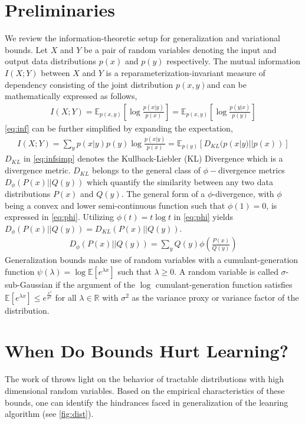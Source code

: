 \documentclass{article}
\begin{document}
\section{Preliminaries}
We review the information-theoretic setup for generalization and variational bounds. Let $X$ and $Y$ be a pair of random variables denoting the input and output data distributions $p(x)$ and $p(y)$ respectively. The mutual information $I(X;Y)$ between $X$ and $Y$ is a reparameterization-invariant measure of dependency consisting of the joint distribution $p(x,y)$and can be mathematically expressed as follows,
\begin{gather}
  I(X;Y) = \mathbb{E}_{p(x,y)}[\log\frac{p(x|y)}{p(x)}] = \mathbb{E}_{p(x,y)}[\log\frac{p(y|x)}{p(y)}] \label{eq:inf}
\end{gather}
\autoref{eq:inf} can be further simplified by expanding the expectation, 
\begin{gather}
  I(X;Y) = \sum_{y}p(x|y)p(y)\log\frac{p(x|y)}{p(x)} = \mathbb{E}_{p(y)}[D_{KL}(p(x|y)||p(x))] \label{eq:infsimp}
\end{gather}
$D_{KL}$ in \autoref{eq:infsimp} denotes the Kullback-Liebler (KL) Divergence \cite{kl} which is a divergence metric. $D_{KL}$ belongs to the general class of $\phi-$divergence metrics $D_{\phi}(P(x)||Q(y))$ which quantify the similarity between any two data distributions $P(x)$ and $Q(y)$. The general form of a $\phi$-divergence, with $\phi$ being a convex and lower semi-continuous function such that $\phi(1)=0$, is expressed in \autoref{eq:phi}. Utilizing $\phi(t)=t\log t$ in \autoref{eq:phi} yields $D_{\phi}(P(x)||Q(y))=D_{KL}(P(x)||Q(y))$.
\begin{gather}
  D_{\phi}(P(x)||Q(y)) = \sum_{y}Q(y)\phi(\frac{P(x)}{Q(y)}) \label{eq:phi}
\end{gather}   
Generalization bounds make use of random variables with a cumulant-generation \cite{cover} function $\psi(\lambda) = \log\mathbb{E}[e^{\lambda x}]$ such that $\lambda \geq 0$. A random variable is called $\sigma$-sub-Gaussian if the argument of the $\log$ cumulant-generation function satisfies $\mathbb{E}[e^{\lambda x}] \leq e^{\frac{\lambda^{2}}{\sigma^{2}}}$ for all $\lambda \in \mathbb{R}$ with $\sigma^{2}$ as the variance proxy or variance factor of the distribution.  


\section{When Do Bounds Hurt Learning?}
The work of \cite{variational} throws light on the behavior of tractable distributions with high dimensional random variables. Based on the empirical characteristics of these bounds, one can identify the hindrances faced in generalization of the leanring algorithm (see \autoref{fig:dist}).
\end{document}
